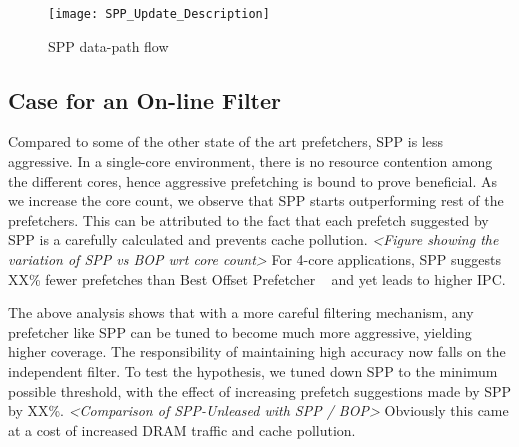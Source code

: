 \begin{figure}
  \begin{center}
  \texttt{[image: SPP\_Update\_Description]}
  \label{fig:spp_update}
  \caption{SPP data-path flow}
  \end{center}
\end{figure}




\subsection{Case for an On-line Filter}
\label{Background-Case}

Compared to some of the other state of the art prefetchers, SPP is
less aggressive.  In a single-core environment, there is no resource
contention among the different cores, hence aggressive prefetching is bound to prove beneficial. 
As we increase the core
count, we observe that SPP starts outperforming rest of the prefetchers.  This
can be attributed to the fact that each prefetch suggested by SPP is a
carefully calculated and prevents cache pollution.  \textit{<Figure
showing the variation of SPP vs BOP wrt core count>} For 4-core applications,
SPP suggests XX\% fewer prefetches than Best Offset Prefetcher ~\cite{bop} and yet leads to higher IPC.

The above analysis shows that with a more careful filtering mechanism, any
prefetcher like SPP can be tuned to become much more aggressive, yielding higher coverage.  The responsibility of maintaining high accuracy now falls on the
independent filter.  To test the hypothesis, we tuned down SPP to the
minimum possible threshold, with the effect of increasing prefetch suggestions
made by SPP by XX\%.  \textit{<Comparison of SPP-Unleased with SPP / BOP>}
Obviously this came at a cost of increased DRAM traffic and cache pollution.

